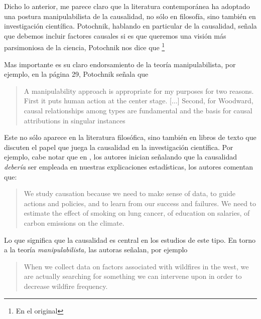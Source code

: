 
Dicho lo anterior, me parece claro que la
literatura contemporánea ha adoptado una postura
manipulabilista de la causalidad, no sólo en filosofía, sino
también en investigación científica. Potochnik, hablando en
particular de la causalidad, señala que debemos incluir factores causales si es que queremos una visión más
parsimoniosa de la ciencia, Potochnik nos dice que
\footnote{
  En el original 
}
\parencite[][p.~24]{Potochnik2017-POTIAT-3}

Mas importante es su claro endorsamiento de la teoría
manipulabilista, por ejemplo, en la página 29, Potochnik
señala que 


\begin{quote}
  A manipulability approach is appropriate for my purposes for
  two reasons. First it puts human action at the center stage.
  [$\ldots$] Second, for Woodward, causal relationships among
  types are fundamental and the basis for causal attributions
  in singular instances \parencite[p.~29]{Potochnik2017-POTIAT-3}
\end{quote}

Este  no sólo aparece en la literatura
filosófica, sino también en libros de texto que discuten el
papel que juega la causalidad en la investigación
científica. Por ejemplo, cabe notar que en \parencite{Pearl2016},
los autores  inician señalando que la causalidad
\emph{debería} ser empleada en nuestras explicaciones
estadísticas, los autores comentan que:

	\begin{quote}
  	We study causation because we need to make sense of
	  data, to guide actions and policies, and to learn from
	  our success and failures. We need to estimate the effect
	  of smoking on lung cancer, of education on salaries, of
    carbon emissions on the climate. \parencite[p.~1]{Pearl2016}
	\end{quote}

Lo que significa que la causalidad es central en
los estudios de este tipo. En torno a la teoría
\emph{manipulabilista,} las autoras señalan, por ejemplo

	\begin{quote}
	  When we collect data on factors associated with
    wildfires in the west, we are actually searching for
    something we can intervene upon in order to decrease
    wildfire frequency. \parencite[p.~53]{Pearl2016}
	\end{quote}

